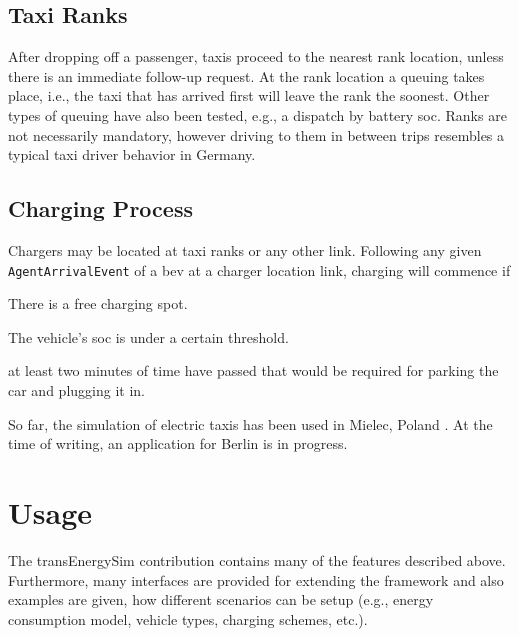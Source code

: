 \subsection{Taxi Ranks}
After dropping off a passenger, taxis proceed to the nearest rank location, unless there is an immediate follow-up request. At the rank location a queuing takes place, i.e., the taxi that has arrived first will leave the rank the soonest. Other types of queuing have also been tested, e.g., a dispatch by battery \gls{soc}.
Ranks are not necessarily mandatory, however driving to them in between trips resembles a typical taxi driver behavior in Germany.

\subsection{Charging Process}
Chargers may be located at taxi ranks or any other link. Following any given \lstinline$AgentArrivalEvent$ of a \gls{bev} at a charger location link, charging will commence if
%
\begin{compactitem}
	\item There is a free charging spot.
	\item The vehicle's \gls{soc} is under a certain threshold.
	\item at least two minutes of time have passed that would be required for parking the car and plugging it in.
\end{compactitem}

So far, the simulation of electric taxis has been used in Mielec, Poland \citep[][]{Bischoff2013MaTaxis, BischoffMaciejewskiEcabMielecMobilTUM}. At the time of writing, an application for Berlin is in progress.

\section{Usage}
The transEnergySim \gls{contribution} contains many of the features described above. Furthermore, many interfaces are provided for extending the framework and also examples are given, how different scenarios can be setup (e.g., energy consumption model, vehicle types, charging schemes, etc.).



